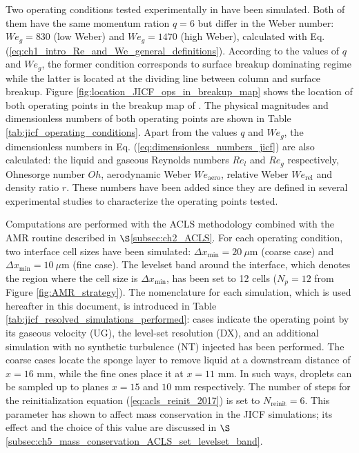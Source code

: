 Two operating conditions tested experimentally in  have been simulated. Both of them have the same momentum ration $q = 6$ but differ in the Weber number: $We_g = 830$ (low Weber) and $We_g = 1470$ (high Weber), calculated with Eq. (\ref{eq:ch1_intro_Re_and_We_general_definitions}). According to the values of $q$ and $We_g$, the former condition corresponds to surface breakup dominating regime while the latter is located at the dividing line between column and surface breakup. Figure \ref{fig:location_JICF_ops_in_breakup_map} shows the location of both operating points in the breakup map of \citeColor[wu_breakup_1997]. The physical magnitudes and dimensionless numbers of both operating points are shown in Table \ref{tab:jicf_operating_conditions}. Apart from the values $q$ and $We_g$, the dimensionless numbers in  Eq. (\ref{eq:dimensionless_numbers_jicf}) are also calculated: the liquid and gaseous Reynolds numbers $Re_l$ and $Re_g$ respectively, Ohnesorge number $Oh$, aerodynamic Weber $We_\mathrm{aero}$, relative Weber $We_\mathrm{rel}$ and density ratio $r$. These numbers have been added since they are defined in several experimental studies  to characterize the operating points tested. 

Computations are performed with the ACLS methodology combined with the AMR routine described in $\S$\ref{subsec:ch2_ACLS}. For each operating condition, two interface cell sizes have been simulated: $\Delta x_\mathrm{min} = 20 ~\mu$m (coarse case) and $\Delta x_\mathrm{min} = 10 ~\mu$m (fine case). The levelset band around the interface, which denotes the region where the cell size is $\Delta x_\mathrm{min}$, has been set to 12 cells ($N_p = 12$ from Figure \ref{fig:AMR_strategy}). The nomenclature for each simulation, which is used hereafter in this document, is introduced in Table \ref{tab:jicf_resolved_simulations_performed}: cases indicate the operating point by its gaseous velocity (UG), the level-set resolution (DX), and an additional simulation with no synthetic turbulence (NT) injected has been performed.  The coarse cases locate the sponge layer to remove liquid at a downstream distance of $x = 16$ mm, while the fine ones place it at $x = 11$ mm. In such ways, droplets can be sampled up to planes $x = 15$ and $10$ mm respectively. The number of steps for the reinitialization equation (\ref{eq:acls_reinit_2017}) is set to $N_\mathrm{reinit} = 6$. This parameter has shown to affect mass conservation in the JICF simulations; its effect and the choice of this value are discussed in $\S$\ref{subsec:ch5_mass_conservation_ACLS_set_levelset_band}.


